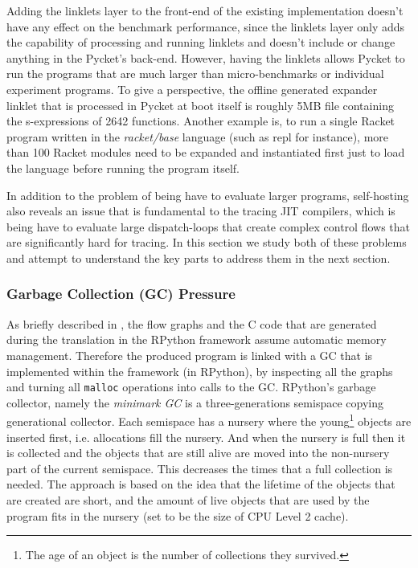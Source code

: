Adding the linklets layer to the front-end of the existing
implementation doesn't have any effect on the benchmark performance,
since the linklets layer only adds the capability of processing and
running linklets and doesn't include or change anything in the
Pycket's back-end. However, having the linklets allows Pycket to run
the programs that are much larger than micro-benchmarks or individual
experiment programs. To give a perspective, the offline generated
expander linklet that is processed in Pycket at boot itself is roughly
5MB file containing the s-expressions of 2642 functions. Another
example is, to run a single Racket program written in the
\emph{racket/base} language (such as repl for instance), more than 100
Racket modules need to be expanded and instantiated first just to load
the language before running the program itself.

In addition to the problem of being have to evaluate larger programs,
self-hosting also reveals an issue that is fundamental to the tracing
JIT compilers, which is being have to evaluate large dispatch-loops
that create complex control flows that are significantly hard for
tracing. In this section we study both of these problems and attempt
to understand the key parts to address them in the next section.

\subsubsection{Garbage Collection (GC) Pressure}

As briefly described in , the flow graphs and
the C code that are generated during the translation in the RPython
framework assume automatic memory management. Therefore the produced
program is linked with a GC that is implemented within the framework
(in RPython), by inspecting all the graphs and turning all
\texttt{malloc} operations into calls to the GC. RPython's garbage
collector, namely the \emph{minimark GC} is a three-generations
semispace copying generational collector. Each semispace has a nursery
where the young\footnote{The age of an object is the number of
  collections they survived.}  objects are inserted first,
i.e. allocations fill the nursery. And when the nursery is full then
it is collected and the objects that are still alive are moved into
the non-nursery part of the current semispace. This decreases the
times that a full collection is needed. The approach is based on the
idea that the lifetime of the objects that are created are short, and
the amount of live objects that are used by the program fits in the
nursery (set to be the size of CPU Level 2 cache). \cite{pypy06,
  bolz:14, gc:16, gc:12}

